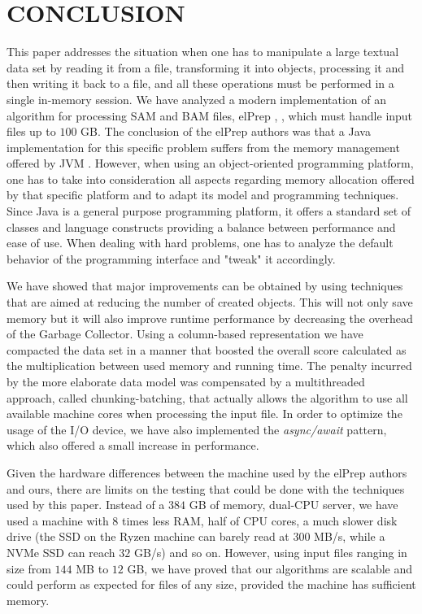 \documentclass[a4paper,twoside]{article}
\begin{document}
\section{\uppercase{Conclusion}}
This paper addresses the situation when one has to manipulate a large textual data set by reading it from a file, transforming it into objects, processing it and then writing it back to a file, and all these operations must be performed in a single in-memory session.
We have analyzed a modern implementation of an algorithm for processing SAM and BAM files, elPrep \cite{herzeel:2015}, \cite{herzeel:2019}, which must handle input files up to $100$ GB.
The conclusion of the elPrep authors was that a Java implementation for this specific problem suffers from the memory management offered by JVM \cite{costanza:2019}.
However, when using an object-oriented programming platform, one has to take into consideration all aspects regarding memory allocation offered by that specific platform and to adapt its model and programming techniques. Since Java is a general purpose programming platform, it offers a standard set of classes and language constructs providing a balance between performance and ease of use. When dealing with hard problems, one has to analyze the default behavior of the programming interface and "tweak" it accordingly.

We have showed that major improvements can be obtained by using techniques that are aimed at reducing the number of created objects. This will not only save memory but it will also improve runtime performance by decreasing the overhead of the Garbage Collector.
Using a column-based representation we have compacted the data set in a manner that boosted the overall score calculated as the multiplication between used memory and running time. 
The penalty incurred by the more elaborate data model was compensated by a multithreaded approach, called chunking-batching, that actually allows the algorithm to use all available machine cores when processing the input file. In order to optimize the usage of the I/O device, we have also implemented the {\it async/await} pattern, which also offered a small increase in performance.

Given the hardware differences between the machine used by the elPrep authors and ours, there are limits on the testing that could be done with the techniques used by this paper.
Instead of a $384$ GB of memory, dual-CPU server, we have used a machine  with $8$ times less RAM, half of CPU cores, a much slower disk drive (the SSD on the Ryzen machine can barely read at 300 MB/s, while a NVMe SSD can reach $32$ GB/s) and so on.
However, using input files ranging in size from $144$ MB to $12$ GB, we have proved that our algorithms are scalable and could perform as expected for files of any size, provided the machine has sufficient memory.






{\small
}
\end{document}
